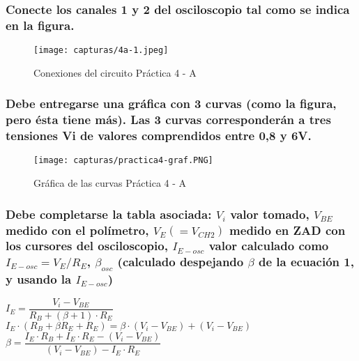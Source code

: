 \subsubsection{Conecte los canales 1 y 2 del
	osciloscopio tal como se indica en la figura.}

\begin{figure}[H] %
	\centering
	\texttt{[image: capturas/4a-1.jpeg]} 
	\caption{Conexiones del circuito Práctica 4 - A}
	\label{fig:4a-1}
\end{figure}

\subsubsection{Debe entregarse una gráfica con 3 curvas (como la figura, pero ésta tiene más). Las 3 curvas
	corresponderán a tres tensiones Vi de valores comprendidos entre 0,8 y 6V.}

\begin{figure}[H] %
	\centering
	\texttt{[image: capturas/practica4-graf.PNG]} 
	\caption{Gráfica de las curvas Práctica 4 - A}
	\label{fig:practica4-graf}
\end{figure}


\subsubsection{Debe completarse la tabla
	asociada: $ V_{i} $ valor tomado, $ V_{BE} $ medido con el polímetro, $ V_{E} (=V_{CH2}) $ medido en ZAD con los cursores
	del osciloscopio, $ I_{E-osc} $ valor calculado como $ I_{E-osc}=V_{E}/R_{E} $, $ \beta_{osc} $ (calculado despejando $ \beta $ de la ecuación
	1, y usando la $ I_{E-osc} $)}

$ I_{E} = \dfrac{V_{i}-V_{BE}}{R_{B}+(\beta+1)\cdot R_{E} } $
\\

$ I_{E}\cdot(R_{B}+\beta R_{E} +  R_{E} ) = \beta \cdot(V_{i}-V_{BE}) +  (V_{i}-V_{BE})$
\\

$ \beta = \dfrac{I_{E}\cdot R_{B} + I_{E}\cdot R_{E} - (V_{i}-V_{BE})}{(V_{i}-V_{BE}) - I_{E}\cdot R_{E}} $


